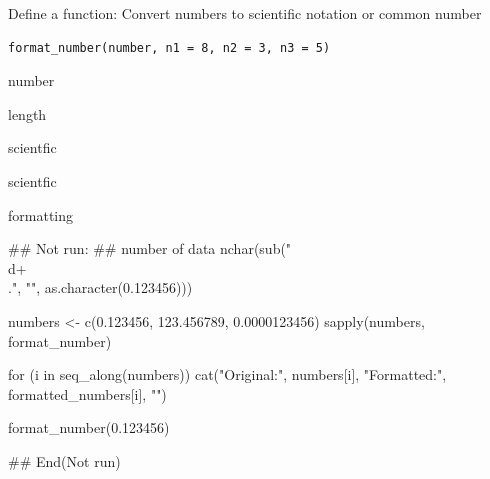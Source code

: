 \documentclass[a4paper]{book}
\begin{document}
%
\begin{Description}
Define a function: Convert numbers to scientific notation or common number
\end{Description}
%
\begin{Usage}
\begin{verbatim}
format_number(number, n1 = 8, n2 = 3, n3 = 5)
\end{verbatim}
\end{Usage}
%
\begin{Arguments}
\begin{ldescription}
\item[\code{number}] number

\item[\code{n1}] length

\item[\code{n2}] scientfic

\item[\code{n3}] scientfic
\end{ldescription}
\end{Arguments}
%
\begin{Value}
formatting
\end{Value}
%
\begin{Examples}
\begin{ExampleCode}
\#\# Not run: 
## number of data
nchar(sub("\\d+\\.", "", as.character(0.123456)))

numbers <- c(0.123456, 123.456789, 0.0000123456)
sapply(numbers, format_number)

for (i in seq_along(numbers)) {
   cat("Original:", numbers[i], "Formatted:", formatted_numbers[i], "\n")}

format_number(0.123456)


## End(Not run)

\end{ExampleCode}
\end{Examples}
\end{document}
